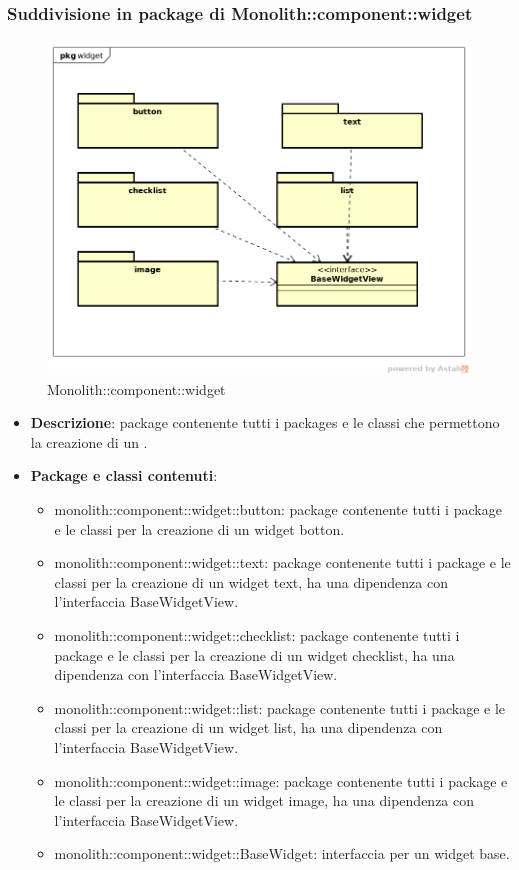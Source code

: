 \subsubsection{Suddivisione in package  di Monolith::component::widget}
\label{Monolith::component::widget}
\begin{figure}[H]
	\centering
	\includegraphics[scale=0.5]{Sezioni/imgPackage/component_widget.png}
	\caption{Monolith::component::widget}
\end{figure}
\begin{itemize}
	\item{\textbf{Descrizione}}: package contenente tutti i packages e le classi che permettono la creazione di un .
	\item{\textbf{Package e classi contenuti}}:
	\begin{itemize}
	\item{monolith::component::widget::button}: package contenente tutti i package e le classi per la creazione di un widget botton.
	\item{monolith::component::widget::text}: package contenente tutti i package e le classi per la creazione di un widget text, ha una dipendenza con l'interfaccia BaseWidgetView.
	\item{monolith::component::widget::checklist}: package contenente tutti i package e le classi per la creazione di un widget checklist, ha una dipendenza con l'interfaccia BaseWidgetView.
	\item{monolith::component::widget::list}: package contenente tutti i package e le classi per la creazione di un widget list, ha una dipendenza con l'interfaccia BaseWidgetView.
	\item{monolith::component::widget::image}: package contenente tutti i package e le classi per la creazione di un widget image, ha una dipendenza con l'interfaccia BaseWidgetView.
	\item{monolith::component::widget::BaseWidget}: interfaccia per un widget base.
	\end{itemize}

\end{itemize}

